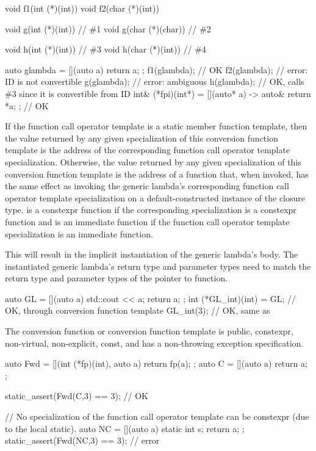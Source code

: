 \begin{example}
\begin{codeblock}
void f1(int (*)(int))   { }
void f2(char (*)(int))  { }

void g(int (*)(int))    { }     // \#1
void g(char (*)(char))  { }     // \#2

void h(int (*)(int))    { }     // \#3
void h(char (*)(int))   { }     // \#4

auto glambda = [](auto a) { return a; };
f1(glambda);                    // OK
f2(glambda);                    // error: ID is not convertible
g(glambda);                     // error: ambiguous
h(glambda);                     // OK, calls \#3 since it is convertible from ID
int& (*fpi)(int*) = [](auto* a) -> auto& { return *a; };        // OK
\end{codeblock}
\end{example}

\pnum
If the function call operator template is a static member function template,
then the value returned by
any given specialization of this conversion function template is
the address of the corresponding function call operator template specialization.
Otherwise,
the value returned by any given specialization of this conversion function
template is the address of a function  that, when invoked, has the same
effect as invoking the generic lambda's corresponding function call operator
template specialization on a default-constructed instance of the closure type.
 is a constexpr function
if the corresponding specialization is a constexpr function and
 is an immediate function
if the function call operator template specialization is an immediate function.
\begin{note}
This will result in the implicit instantiation of the generic lambda's body.
The instantiated generic lambda's return type and parameter types need to match
the return type and parameter types of the pointer to function.
\end{note}
\begin{example}
\begin{codeblock}
auto GL = [](auto a) { std::cout << a; return a; };
int (*GL_int)(int) = GL;        // OK, through conversion function template
GL_int(3);                      // OK, same as 
\end{codeblock}
\end{example}

\pnum
The conversion function or conversion function template is public,
constexpr, non-virtual, non-explicit, const, and has a non-throwing exception
specification.
\begin{example}
\begin{codeblock}
auto Fwd = [](int (*fp)(int), auto a) { return fp(a); };
auto C = [](auto a) { return a; };

static_assert(Fwd(C,3) == 3);   // OK

// No specialization of the function call operator template can be constexpr (due to the local static).
auto NC = [](auto a) { static int s; return a; };
static_assert(Fwd(NC,3) == 3);  // error
\end{codeblock}
\end{example}

